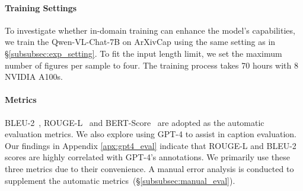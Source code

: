 \paragraph{Training Settings} 
To investigate whether in-domain training can enhance the model's capabilities, we train the Qwen-VL-Chat-7B on ArXivCap using the same setting as in \S\ref{subsubsec:exp_setting}. To fit the input length limit, we set the maximum number of figures per sample to four. The training process takes 70 hours with 8 NVIDIA A100s.

\paragraph{Metrics}BLEU-2~\citep{bleu}, ROUGE-L~\citep{lin-2004-rouge} and BERT-Score~\citep{bertscore} are adopted as the automatic evaluation metrics.
We also explore using GPT-4 to assist in caption evaluation. Our findings in Appendix \ref{apx:gpt4_eval} indicate that ROUGE-L and BLEU-2 scores are highly correlated with GPT-4's annotations. We primarily use these three metrics due to their convenience. A manual error analysis is conducted to supplement the automatic metrics~(\S\ref{subsubsec:manual_eval}).




